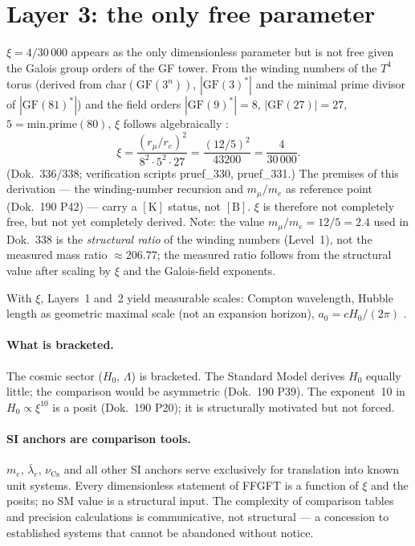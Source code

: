 \section{Layer 3: the only free parameter}

$\xi = 4/30\,000$ appears as the only dimensionless parameter but is not free
given the Galois group orders of the GF tower. From the winding numbers of the
$T^4$ torus (derived from char$(\text{GF}(3^n))$, $|\text{GF}(3)^*|$ and the
minimal prime divisor of $|\text{GF}(81)^*|$) and the field orders
$|\text{GF}(9)^*|=8$, $|\text{GF}(27)|=27$, $5=\text{min.prime}(80)$, $\xi$
follows algebraically \KM:
\[
  \xi = \frac{(r_\mu/r_e)^2}{8^2\cdot5^2\cdot27} = \frac{(12/5)^2}{43200} = \frac{4}{30\,000}.
\]
(Dok.~336/338; verification scripts pruef\_330, pruef\_331.) The premises of
this derivation --- the winding-number recursion and $m_\mu/m_e$ as reference
point (Dok.~190 P42) --- carry a $[\text{K}]$ status, not $[\text{B}]$. $\xi$
is therefore not completely free, but not yet completely derived.
Note: the value $m_\mu/m_e = 12/5 = 2.4$ used in Dok.~338 is the
\emph{structural ratio} of the winding numbers (Level~1), not the measured
mass ratio $\approx 206.77$; the measured ratio follows from the structural
value after scaling by $\xi$ and the Galois-field exponents.

With $\xi$, Layers~1 and~2 yield measurable scales: Compton wavelength,
Hubble length as geometric maximal scale (not an expansion horizon),
$a_0=cH_0/(2\pi)$ \KM.

\paragraph{What is bracketed.}
The cosmic sector ($H_0$, $\Lambda$) is bracketed. The Standard Model derives
$H_0$ equally little; the comparison would be asymmetric (Dok.~190 P39). The
exponent~10 in $H_0\propto\xi^{10}$ is a posit (Dok.~190 P20); it is
structurally motivated but not forced.

\paragraph{SI anchors are comparison tools.}
$m_e$, $\bar\lambda_e$, $\nu_{\mathrm{Cs}}$ and all other SI anchors serve
exclusively for translation into known unit systems. Every dimensionless
statement of FFGFT is a function of $\xi$ and the posits; no SM value is a
structural input. The complexity of comparison tables and precision calculations
is communicative, not structural --- a concession to established systems that
cannot be abandoned without notice.

